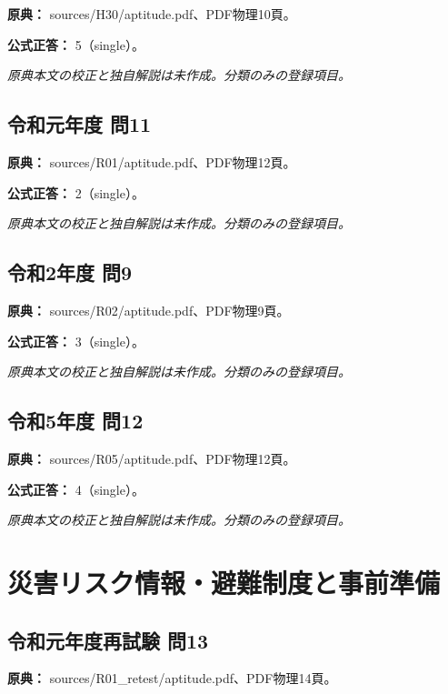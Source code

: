\noindent\textbf{原典：} sources/H30/aptitude.pdf、PDF物理10頁。

\textbf{公式正答：} 5（single）。

\par\textit{原典本文の校正と独自解説は未作成。分類のみの登録項目。}

\subsection{令和元年度 問11}
\label{q:r01-reg-apt-11}

\noindent\textbf{原典：} sources/R01/aptitude.pdf、PDF物理12頁。

\textbf{公式正答：} 2（single）。

\par\textit{原典本文の校正と独自解説は未作成。分類のみの登録項目。}

\subsection{令和2年度 問9}
\label{q:r02-reg-apt-09}

\noindent\textbf{原典：} sources/R02/aptitude.pdf、PDF物理9頁。

\textbf{公式正答：} 3（single）。

\par\textit{原典本文の校正と独自解説は未作成。分類のみの登録項目。}

\subsection{令和5年度 問12}
\label{q:r05-reg-apt-12}

\noindent\textbf{原典：} sources/R05/aptitude.pdf、PDF物理12頁。

\textbf{公式正答：} 4（single）。

\par\textit{原典本文の校正と独自解説は未作成。分類のみの登録項目。}

\section{災害リスク情報・避難制度と事前準備}

\subsection{令和元年度再試験 問13}
\label{q:r01-ret-apt-13}

\noindent\textbf{原典：} sources/R01\_retest/aptitude.pdf、PDF物理14頁。

